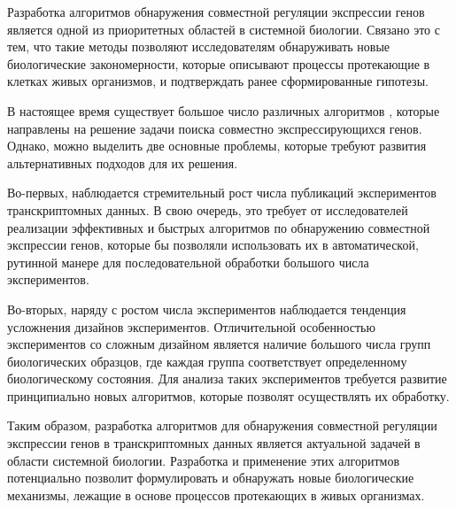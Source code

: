 
{\actuality} Разработка алгоритмов обнаружения совместной регуляции экспрессии генов является одной из приоритетных областей в системной биологии.
Связано это с тем, что такие методы позволяют исследователям обнаруживать новые биологические закономерности, которые описывают процессы протекающие в клетках живых организмов, и подтверждать ранее сформированные гипотезы.


В настоящее время существует большое число различных алгоритмов \cite{subramanian2005gene, wu2012camera}, которые направлены на решение задачи поиска совместно экспрессирующихся генов. 
Однако, можно выделить две основные проблемы, которые требуют развития альтернативных подходов для их решения.

Во-первых, наблюдается стремительный рост числа публикаций экспериментов транскриптомных данных.
В свою очередь, это требует от исследователей реализации эффективных и быстрых алгоритмов по обнаружению совместной экспрессии генов, которые бы позволяли использовать их в автоматической, рутинной манере для последовательной обработки большого числа экспериментов.

Во-вторых, наряду с ростом числа экспериментов наблюдается тенденция усложнения дизайнов экспериментов.
Отличительной особенностью экспериментов со сложным дизайном является наличие большого числа групп биологических образцов, где каждая группа соответствует определенному биологическому состояния.
Для анализа таких экспериментов требуется развитие принципиально новых алгоритмов, которые позволят осуществлять их обработку. 

Таким образом, разработка алгоритмов для обнаружения совместной регуляции экспрессии генов в транскриптомных данных является актуальной задачей в области системной биологии. 
Разработка и применение этих алгоритмов потенциально позволит формулировать и обнаружать новые биологические механизмы, лежащие в основе процессов протекающих в живых организмах. 


